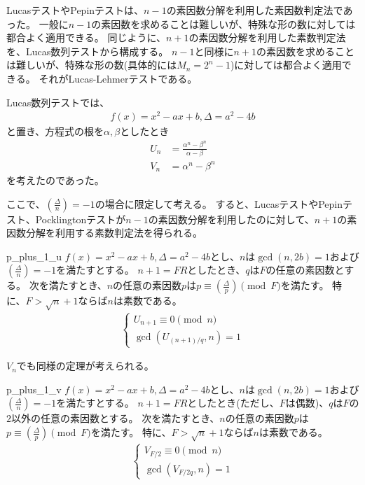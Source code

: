 LucasテストやPepinテストは、$n-1$の素因数分解を利用した素因数判定法であった。
一般に$n-1$の素因数を求めることは難しいが、特殊な形の数に対しては都合よく適用できる。
同じように、$n+1$の素因数分解を利用した素数判定法を、Lucas数列テストから構成する。
$n-1$と同様に$n+1$の素因数を求めることは難しいが、特殊な形の数(具体的には$M_n=2^n-1$)に対しては都合よく適用できる。
それがLucas-Lehmerテストである。

Lucas数列テストでは、
\begin{align*}
f(x)=x^2-ax+b, \Delta = a^2-4b
\end{align*}
と置き、方程式の根を$\alpha,\beta$としたとき
\begin{align*}
U_n &= \frac{\alpha^n - \beta^n}{\alpha - \beta}\\
V_n &= \alpha^n - \beta^n
\end{align*}
を考えたのであった。

ここで、$\left(\frac{\Delta}{n}\right)=-1$の場合に限定して考える。
すると、LucasテストやPepinテスト、Pocklingtonテストが$n-1$の素因数分解を利用したのに対して、$n+1$の素因数分解を利用する素数判定法を得られる。

\begin{Theo}{}{p_plus_1_u}
$f(x)=x^2-ax+b, \Delta = a^2-4b$とし、$n$は$\gcd(n,2b)=1$および$\left(\frac{\Delta}{n}\right)=-1$を満たすとする。
$n+1=FR$としたとき、$q$は$F$の任意の素因数とする。
次を満たすとき、$n$の任意の素因数$p$は$p\equiv\left(\frac{\Delta}{p}\right)\pmod{F}$を満たす。
特に、$F>\sqrt{n}+1$ならば$n$は素数である。
\begin{align*}
\begin{cases}
U_{n+1} \equiv 0 \pmod{n}\\
\gcd(U_{(n+1)/q}, n) = 1
\end{cases}
\end{align*}
\end{Theo}

$V_n$でも同様の定理が考えられる。

\begin{Theo}{}{p_plus_1_v}
$f(x)=x^2-ax+b, \Delta = a^2-4b$とし、$n$は$\gcd(n,2b)=1$および$\left(\frac{\Delta}{n}\right)=-1$を満たすとする。
$n+1=FR$としたとき(ただし、$F$は偶数)、$q$は$F$の$2$以外の任意の素因数とする。
次を満たすとき、$n$の任意の素因数$p$は$p\equiv\left(\frac{\Delta}{p}\right)\pmod{F}$を満たす。
特に、$F>\sqrt{n}+1$ならば$n$は素数である。
\begin{align*}
\begin{cases}
V_{F/2} \equiv 0 \pmod{n}\\
\gcd(V_{F/2q}, n) = 1
\end{cases}
\end{align*}
\end{Theo}

